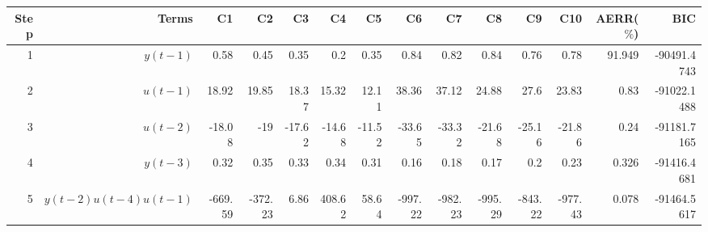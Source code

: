 \begin{tabular}{rrrrrrrrrrrrrr}
Step & Terms & C1 & C2 & C3 & C4 & C5 & C6 & C7 & C8 & C9 & C10 & AERR($\%$) & BIC \\ 
\hline 
1 & $y(t-1)$ & 0.58 & 0.45 & 0.35 & 0.2 & 0.35 & 0.84 & 0.82 & 0.84 & 0.76 & 0.78 & 91.949 & -90491.4743 \\ 
2 & $u(t-1)$ & 18.92 & 19.85 & 18.37 & 15.32 & 12.11 & 38.36 & 37.12 & 24.88 & 27.6 & 23.83 & 0.83 & -91022.1488 \\ 
3 & $u(t-2)$ & -18.08 & -19 & -17.62 & -14.68 & -11.52 & -33.65 & -33.32 & -21.68 & -25.16 & -21.86 & 0.24 & -91181.7165 \\ 
4 & $y(t-3)$ & 0.32 & 0.35 & 0.33 & 0.34 & 0.31 & 0.16 & 0.18 & 0.17 & 0.2 & 0.23 & 0.326 & -91416.4681 \\ 
5 & $y(t-2)u(t-4)u(t-1)$ & -669.59 & -372.23 & 6.86 & 408.62 & 58.64 & -997.22 & -982.23 & -995.29 & -843.22 & -977.43 & 0.078 & -91464.5617 \\ 
\hline 
\end{tabular}